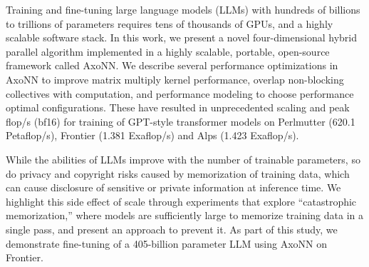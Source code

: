 Training and fine-tuning large language models (LLMs) with hundreds of billions
to trillions of parameters requires tens of thousands of GPUs, and a highly
scalable software stack. In this work, we present a novel four-dimensional
hybrid parallel algorithm implemented in a highly scalable, portable,
open-source framework called AxoNN. We describe several performance
optimizations in AxoNN to improve matrix multiply kernel performance, overlap
non-blocking collectives with computation, and performance modeling to choose
performance optimal configurations.  These have resulted in unprecedented
scaling and peak flop/s (bf16) for training of GPT-style transformer models on
Perlmutter (620.1 Petaflop/s), Frontier (1.381 Exaflop/s) and Alps (1.423
Exaflop/s).

While the abilities of LLMs improve with the number of trainable parameters,
so do privacy and copyright risks caused by
 memorization of training data, which can cause disclosure of sensitive or private information at inference time. We
highlight this side effect of scale through experiments that explore
``catastrophic memorization,'' where models are sufficiently large to memorize training data in a single pass, and present an approach to prevent it.
As part of this study, we demonstrate fine-tuning of a 405-billion parameter
LLM using AxoNN on Frontier.
